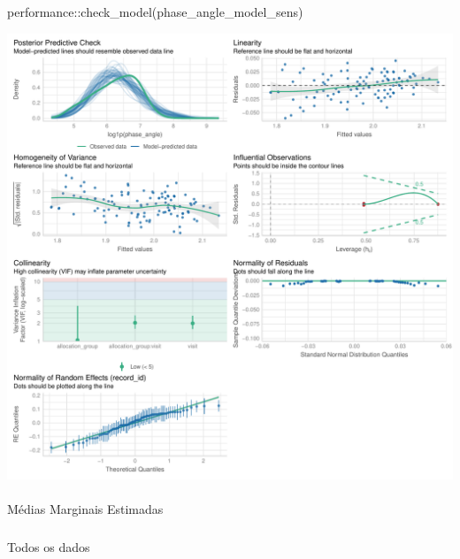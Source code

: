 \documentclass[
  12pt,
]{article}
\makeatletter
\let\oldparagraph\paragraph
\renewcommand{\paragraph}{
    \@ifstar
      \xxxParagraphStar
      \xxxParagraphNoStar
  }
\newcommand{\xxxParagraphStar}[1]{\oldparagraph*{#1}\mbox{}}
\newcommand{\xxxParagraphNoStar}[1]{\oldparagraph{#1}\mbox{}}
\let\oldsubparagraph\subparagraph
\renewcommand{\subparagraph}{
    \@ifstar
      \xxxSubParagraphStar
      \xxxSubParagraphNoStar
  }
\newcommand{\xxxSubParagraphStar}[1]{\oldsubparagraph*{#1}\mbox{}}
\newcommand{\xxxSubParagraphNoStar}[1]{\oldsubparagraph{#1}\mbox{}}
\newenvironment{Shaded}{\begin{snugshade}}{\end{snugshade}}
\newcommand{\FunctionTok}[1]{\textcolor[rgb]{0.28,0.35,0.67}{#1}}
\newcommand{\NormalTok}[1]{\textcolor[rgb]{0.00,0.23,0.31}{#1}}
\newcommand{\SpecialCharTok}[1]{\textcolor[rgb]{0.37,0.37,0.37}{#1}}
\makeatother
\begin{document}
\begin{Shaded}
\begin{Highlighting}[]
\NormalTok{performance}\SpecialCharTok{::}\FunctionTok{check\_model}\NormalTok{(phase\_angle\_model\_sens)}
\end{Highlighting}
\end{Shaded}

\includegraphics{Outcomes_files/figure-pdf/phase_angle_4-2.pdf}

\paragraph{Médias Marginais
Estimadas}\label{muxe9dias-marginais-estimadas-17}

\subparagraph{Todos os dados}\label{todos-os-dados-17}
\end{document}
